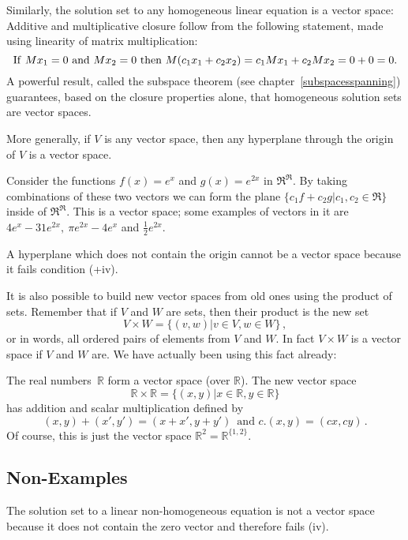 Similarly, the solution set to any homogeneous linear equation is a vector space:
Additive and multiplicative closure follow from the following statement, made using linearity of matrix multiplication:
\[{\rm If}~Mx_1=0 ~\mbox{and}~Mx_2=0~ \mbox{then} ~M(c_1x_1 + c_2x_2)=c_1Mx_1+c_2Mx_2=0+0=0.\] 
A powerful result, called the subspace theorem (see chapter~\ref{subspacesspanning}) guarantees, based on the closure properties alone, that homogeneous
solution sets are vector spaces.

More generally, if $V$ is any vector space, then any hyperplane through the origin of $V$ is a vector space. 

\begin{example} Consider the functions $f(x)=e^x$ and $g(x)=e^{2x}$ in $\Re^\Re$. By taking combinations of these two vectors we can form the plane $\{ c_1 f+ c_2 g | c_1,c_2 \in \Re\}$
inside of $\Re^\Re$. This is a vector space; 
some examples of vectors in it are 
$4e^x-31e^{2x},~\pi e^{2x}-4e^x$ and $\frac12e^{2x}$. 
\end{example}

A hyperplane which does not contain the origin cannot be a vector space because it fails condition (+iv).

It is also possible to build new vector spaces from old ones using the product of sets. Remember that if $V$ and $W$ are sets, then
their product is the new set
\[
V\times W = \{(v,w)|v\in V, w\in W\}\, ,
\]
or in words, all ordered pairs of elements from $V$ and $W$.
In fact $V\times W$ is a vector space if $V$ and $W$ are. We have actually been using this fact already:

\begin{example}
The real numbers~${\mathbb R}$ form a vector space (over ${\mathbb R}$). The new vector space
\[{\mathbb R}\times {\mathbb R}=\{(x,y)|x\in{\mathbb R}, y\in {\mathbb R}\}\]
has addition and scalar multiplication defined by
\[
(x,y)+(x',y')=(x+x',y+y')\, \mbox{ and } c.(x,y)=(cx,cy)\, .
\]
Of course, this is just the vector space ${\mathbb R}^2={\mathbb R}^{\{1,2\}}$. 
\end{example}

\subsection{Non-Examples} 
The solution set to a linear non-homogeneous equation is not a vector space because it does not contain the zero vector and therefore fails (iv).

